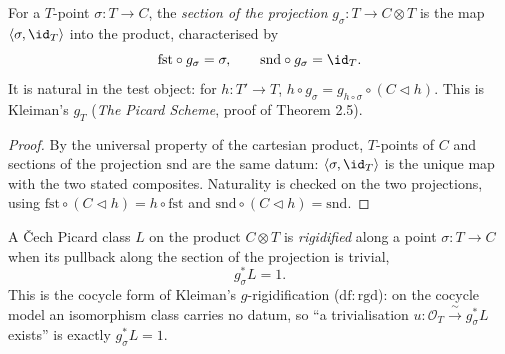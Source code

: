 \begin{definition}
  \label{pa-def:sectionOfPoint}
  \leanok

  For a \(T\)-point \(\sigma \colon T \to C\), the \emph{section of the projection}
  \(g_\sigma \colon T \to C \otimes T\) is the map \(\langle \sigma, \id_T \rangle\) into the
  product, characterised by
  \[
    \mathrm{fst} \circ g_\sigma = \sigma, \qquad \mathrm{snd} \circ g_\sigma = \id_T .
  \]
  It is natural in the test object: for \(h \colon T' \to T\), \(h \circ g_\sigma = g_{h \circ
  \sigma} \circ (C \lhd h)\). This is Kleiman's \(g_T\) (\emph{The Picard Scheme}, proof of
  Theorem 2.5).
\end{definition}
\begin{proof}
  \leanok
  By the universal property of the cartesian product, \(T\)-points of \(C\) and sections of the
  projection \(\mathrm{snd}\) are the same datum: \(\langle \sigma, \id_T\rangle\) is the unique
  map with the two stated composites. Naturality is checked on the two projections, using
  \(\mathrm{fst} \circ (C \lhd h) = h \circ \mathrm{fst}\) and \(\mathrm{snd} \circ (C \lhd h) =
  \mathrm{snd}\).
\end{proof}

\begin{definition}
  \label{pa-def:isRigidified}
  \leanok

  A \v Cech Picard class \(L\) on the product \(C \otimes T\) is \emph{rigidified} along a point
  \(\sigma \colon T \to C\) when its pullback along the section of the projection is trivial,
  \[
    g_\sigma^{*} L = 1 .
  \]
  This is the cocycle form of Kleiman's \(g\)-rigidification (\(\mathrm{df:rgd}\)): on the
  cocycle model an isomorphism class carries no datum, so ``a trivialisation \(u \colon
  \mathcal O_T \xrightarrow{\ \sim\ } g_\sigma^{*} L\) exists'' is exactly \(g_\sigma^{*} L = 1\).
\end{definition}

